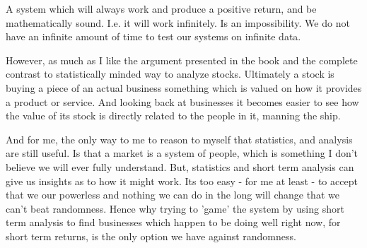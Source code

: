 \documentclass[12pt]{article}
\begin{document}
A system which will always work and produce a positive return, and be mathematically sound. 
I.e. it will work infinitely. Is an impossibility. We do not have an infinite amount of time 
to test our systems on infinite data.

However, as much as I like the argument presented in the book and the complete contrast to 
statistically minded way to analyze stocks. Ultimately a stock is buying a piece of an 
actual business something which is valued on how it provides a product or service. And 
looking back at businesses it becomes easier to see how the value of its stock is directly 
related to the people in it, manning the ship.

And for me, the only way to me to reason to myself that statistics, and analysis are still 
useful. Is that a market is a system of people, which is something I don't believe we will 
ever fully understand. But, statistics and short term analysis can give us insights as to 
how it might work. Its too easy - for me at least - to accept that we our powerless and 
nothing we can do in the long will change that we can't beat randomness. Hence why trying to 
'game' the system by using short term analysis to find businesses which happen to be doing 
well right now, for short term returns, is the only option we have against randomness.

\pagebreak


\end{document}

